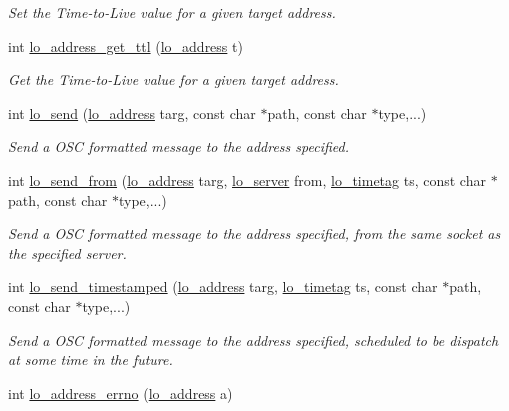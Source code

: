 \begin{DoxyCompactItemize}
\begin{DoxyCompactList}\small\item\em Set the Time-\/to-\/\+Live value for a given target address. \end{DoxyCompactList}\item 
int \hyperlink{group__liblo_ga3652ba694ba3c153dc96917e7321131c}{lo\+\_\+address\+\_\+get\+\_\+ttl} (\hyperlink{lo__types_8h_abf9b53223467de596b89e1377b0f3f3d}{lo\+\_\+address} t)
\begin{DoxyCompactList}\small\item\em Get the Time-\/to-\/\+Live value for a given target address. \end{DoxyCompactList}\item 
int \hyperlink{group__liblo_gafa4253874f97c2c16254ac57d2b7c987}{lo\+\_\+send} (\hyperlink{lo__types_8h_abf9b53223467de596b89e1377b0f3f3d}{lo\+\_\+address} targ, const char $\ast$path, const char $\ast$type,...)
\begin{DoxyCompactList}\small\item\em Send a O\+S\+C formatted message to the address specified. \end{DoxyCompactList}\item 
int \hyperlink{group__liblo_gaa4a314562b09e2fd00749a5d0b4d0955}{lo\+\_\+send\+\_\+from} (\hyperlink{lo__types_8h_abf9b53223467de596b89e1377b0f3f3d}{lo\+\_\+address} targ, \hyperlink{lo__types_8h_a59067bf50cf8abb4371da6f03c9036c9}{lo\+\_\+server} from, \hyperlink{structlo__timetag}{lo\+\_\+timetag} ts, const char $\ast$path, const char $\ast$type,...)
\begin{DoxyCompactList}\small\item\em Send a O\+S\+C formatted message to the address specified, from the same socket as the specified server. \end{DoxyCompactList}\item 
int \hyperlink{group__liblo_ga42ec6437789c7516c5b7909d8504751a}{lo\+\_\+send\+\_\+timestamped} (\hyperlink{lo__types_8h_abf9b53223467de596b89e1377b0f3f3d}{lo\+\_\+address} targ, \hyperlink{structlo__timetag}{lo\+\_\+timetag} ts, const char $\ast$path, const char $\ast$type,...)
\begin{DoxyCompactList}\small\item\em Send a O\+S\+C formatted message to the address specified, scheduled to be dispatch at some time in the future. \end{DoxyCompactList}\item 
int \hyperlink{group__liblo_ga407e1694a2ec58ee5b90c6390e0a5d53}{lo\+\_\+address\+\_\+errno} (\hyperlink{lo__types_8h_abf9b53223467de596b89e1377b0f3f3d}{lo\+\_\+address} a)

\end{DoxyCompactItemize}
